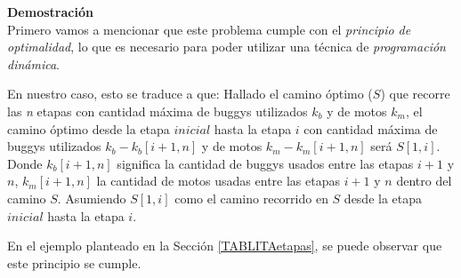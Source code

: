 {\large\textbf{Demostración}}\\


Primero vamos a mencionar que este problema cumple con el \emph{principio de optimalidad}, lo que es necesario para poder utilizar una t\'ecnica de \emph{programaci\'on din\'amica}. 

En nuestro caso, esto se traduce a que: Hallado el camino \'optimo ($S$) que recorre las \emph{n} etapas con cantidad m\'axima de buggys utilizados $k_b$ y de motos $k_m$, el camino \'optimo desde la etapa $inicial$ hasta la etapa $i$ con cantidad m\'axima de buggys utilizados $k_b-k_b[i+1,n]$ y de motos $k_m-k_m[i+1,n]$ ser\'a $S[1,i]$. Donde $k_b[i+1,n]$ significa la cantidad de buggys usados entre las etapas $i+1$ y $n$, $k_m[i+1,n]$ la cantidad de motos usadas entre las etapas $i+1$ y $n$ dentro del camino $S$. Asumiendo $S[1,i]$ como el camino recorrido en $S$ desde la etapa $inicial$ hasta la etapa $i$.\\
\bigskip

En el ejemplo planteado en la Secci\'on \ref{TABLITAetapas}, se puede observar que este principio se cumple.\\

